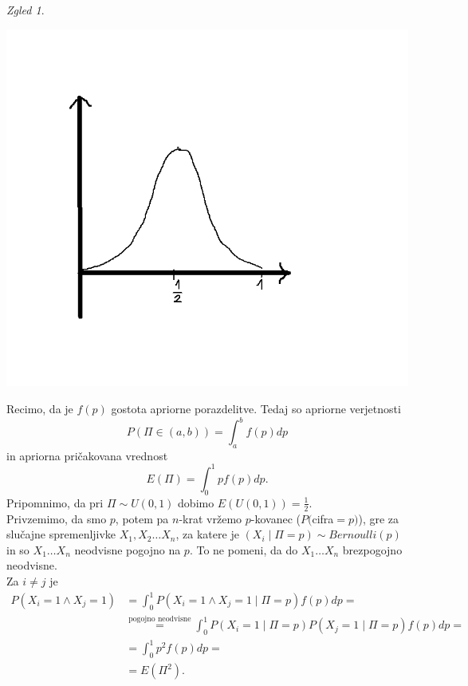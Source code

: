 \documentclass[a4paper, 12pt]{book}
\theoremstyle{definition}
\theoremstyle{remark}
\newtheorem*{exmp}{Zgled}
\begin{document}
\begin{exmp}
\begin{itemize}
      \includegraphics[scale=0.4]{apriori_imamo_1_3} \\
  \end{itemize}
\end{exmp}
Recimo, da je $f(p)$ gostota apriorne porazdelitve. Tedaj so apriorne verjetnosti
\begin{equation*}
  P(\Pi \in (a,b)) = \int_{a}^{b} f(p) dp
\end{equation*}
in apriorna pričakovana vrednost
\begin{equation*}
  E(\Pi) = \int_{0}^{1} p f(p) dp. 
\end{equation*}
Pripomnimo, da pri $\Pi \sim U(0,1)$ dobimo $E(U(0,1)) = \frac{1}{2}$. \\
Privzemimo, da smo  $p$, potem pa  $n$-krat vržemo $p$-kovanec ($P($cifra$=p)$),
gre za slučajne spremenljivke $X_1, X_2 \dots X_n$, za katere je $(X_i \mid \Pi = p) \sim Bernoulli(p)$
in so $X_1 \dots X_n$ neodvisne pogojno na $p$.
To ne pomeni, da do $X_1 \dots X_n$ brezpogojno neodvisne. \\
Za $i \neq j$ je
\begin{align*}
  P(X_i = 1 \land X_j = 1) &= \int_{0}^{1} P(X_i = 1 \land X_j = 1 \mid \Pi = p) f(p) dp = \\
  &\stackrel{\text{pogojno neodvisne}}{=}  \int_{0}^{1} P(X_i = 1 \mid \Pi = p) P(X_j = 1 \mid \Pi = p) f(p) dp = \\
  &= \int_{0}^{1} p^2 f(p) dp = \\
  &= E(\Pi^2).
\end{align*}
\end{document}

